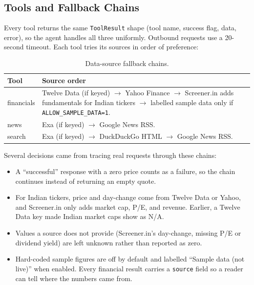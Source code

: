 \documentclass[12pt,a4paper,oneside]{report}
\begin{document}
\subsection{Tools and Fallback Chains}
Every tool returns the same \texttt{ToolResult} shape (tool name, success flag, data, error), so the agent handles all three uniformly. Outbound requests use a 20-second timeout. Each tool tries its sources in order of preference:
\begin{table}[H]\centering\small
\begin{tabularx}{\textwidth}{>{\raggedright\arraybackslash}p{2.2cm}X}
\toprule \textbf{Tool} & \textbf{Source order}\\\midrule
financials & Twelve Data (if keyed) $\rightarrow$ Yahoo Finance $\rightarrow$ Screener.in adds fundamentals for Indian tickers $\rightarrow$ labelled sample data only if \texttt{ALLOW\_SAMPLE\_DATA=1}.\\
news & Exa (if keyed) $\rightarrow$ Google News RSS.\\
search & Exa (if keyed) $\rightarrow$ DuckDuckGo HTML $\rightarrow$ Google News RSS.\\
\bottomrule
\end{tabularx}
\caption{Data-source fallback chains.}
\label{tab:fallbacks}
\end{table}
Several decisions came from tracing real requests through these chains:
\begin{itemize}[leftmargin=*]
\item A ``successful'' response with a zero price counts as a failure, so the chain continues instead of returning an empty quote.
\item For Indian tickers, price and day-change come from Twelve Data or Yahoo, and Screener.in only adds market cap, P/E, and revenue. Earlier, a Twelve Data key made Indian market caps show as N/A.
\item Values a source does not provide (Screener.in's day-change, missing P/E or dividend yield) are left unknown rather than reported as zero.
\item Hard-coded sample figures are off by default and labelled ``Sample data (not live)'' when enabled. Every financial result carries a \texttt{source} field so a reader can tell where the numbers came from.
\end{itemize}
\end{document}
